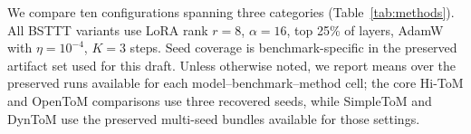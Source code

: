 \documentclass{article}
\begin{document}
We compare ten configurations spanning three categories (Table~\ref{tab:methods}).
All BSTTT variants use LoRA rank $r{=}8$, $\alpha{=}16$, top 25\% of layers, AdamW with $\eta{=}10^{-4}$, $K{=}3$ steps.
Seed coverage is benchmark-specific in the preserved artifact set used for this draft.
Unless otherwise noted, we report means over the preserved runs available for each model--benchmark--method cell; the core Hi-ToM and OpenToM comparisons use three recovered seeds, while SimpleToM and DynToM use the preserved multi-seed bundles available for those settings.



\end{document}
